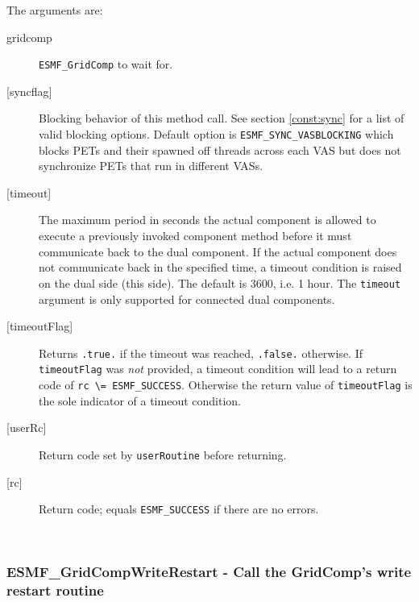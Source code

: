    The arguments are:
   \begin{description}
   \item[gridcomp]
     {\tt ESMF\_GridComp} to wait for.
   \item[{[syncflag]}]
     Blocking behavior of this method call. See section \ref{const:sync}
     for a list of valid blocking options. Default option is
     {\tt ESMF\_SYNC\_VASBLOCKING} which blocks PETs and their spawned off threads
     across each VAS but does not synchronize PETs that run in different VASs.
   \item[{[timeout]}]
     The maximum period in seconds the actual component is allowed to execute
     a previously invoked component method before it must communicate back to
     the dual component. If the actual component does not communicate back in
     the specified time, a timeout condition is raised on the dual side (this
     side). The default is 3600, i.e. 1 hour. The {\tt timeout} argument is only
     supported for connected dual components.
   \item[{[timeoutFlag]}]
     Returns {\tt .true.} if the timeout was reached, {\tt .false.} otherwise.
     If {\tt timeoutFlag} was {\em not} provided, a timeout condition will lead
     to a return code of {\tt rc \textbackslash = ESMF\_SUCCESS}. Otherwise the
     return value of {\tt timeoutFlag} is the sole indicator of a timeout
     condition.
   \item[{[userRc]}]
     Return code set by {\tt userRoutine} before returning.
   \item[{[rc]}]
     Return code; equals {\tt ESMF\_SUCCESS} if there are no errors.
   \end{description}
   
 
\mbox{}\hrulefill\ 
 
\subsubsection [ESMF\_GridCompWriteRestart] {ESMF\_GridCompWriteRestart - Call the GridComp's write restart routine}


